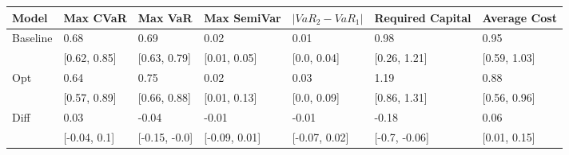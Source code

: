 \begin{tabular}{lllllll}
\toprule
   Model &     Max CVaR &       Max VaR &   Max SemiVar & $|VaR_2 - VaR_1|$ & Required Capital & Average Cost \\
\midrule
Baseline &         0.68 &          0.69 &          0.02 &              0.01 &             0.98 &         0.95 \\
         & [0.62, 0.85] &  [0.63, 0.79] &  [0.01, 0.05] &       [0.0, 0.04] &     [0.26, 1.21] & [0.59, 1.03] \\
     Opt &         0.64 &          0.75 &          0.02 &              0.03 &             1.19 &         0.88 \\
         & [0.57, 0.89] &  [0.66, 0.88] &  [0.01, 0.13] &       [0.0, 0.09] &     [0.86, 1.31] & [0.56, 0.96] \\
    Diff &         0.03 &         -0.04 &         -0.01 &             -0.01 &            -0.18 &         0.06 \\
         & [-0.04, 0.1] & [-0.15, -0.0] & [-0.09, 0.01] &     [-0.07, 0.02] &    [-0.7, -0.06] & [0.01, 0.15] \\
\bottomrule
\end{tabular}
